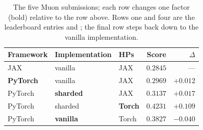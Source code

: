 \begin{table}[htbp]
  \centering
  \caption{The five Muon submissions; each row changes one factor (bold) relative to the row above. Rows one and four are the leaderboard entries \muonjax{} and \muonpt{}; the final row steps back down to the vanilla implementation.}
  \label{tab:muon_waterfall}
  \begin{tabular}{lllrr}
    \toprule
    Framework & Implementation & HPs & Score & $\Delta$ \\
    \midrule
    JAX & vanilla & JAX & $0.2845$ & --- \\
    \textbf{PyTorch} & vanilla & JAX & $0.2969$ & $+0.012$ \\
    PyTorch & \textbf{sharded} & JAX & $0.3137$ & $+0.017$ \\
    PyTorch & sharded & \textbf{Torch} & $0.4231$ & $+0.109$ \\
    PyTorch & \textbf{vanilla} & Torch & $0.3827$ & $-0.040$ \\
    \bottomrule
  \end{tabular}
\end{table}
